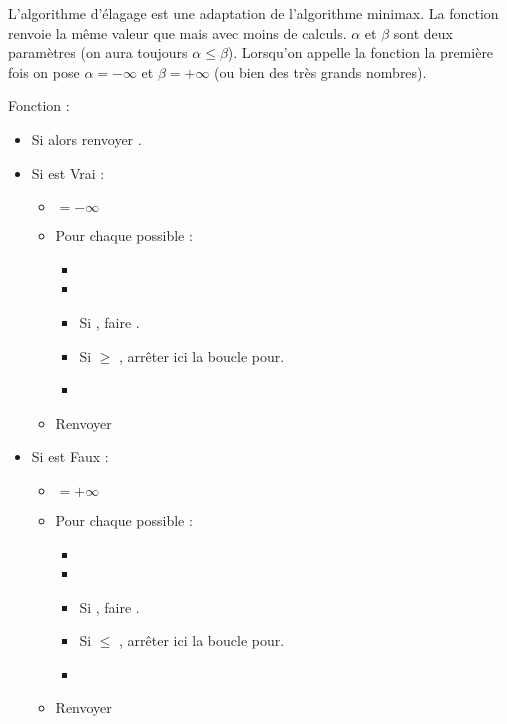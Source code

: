 \documentclass[11pt,class=report,crop=false]{standalone}
\begin{document}
L'algorithme d'élagage est une adaptation de l'algorithme minimax. La fonction  renvoie la même valeur que  mais avec moins de calculs.  
$\alpha$ et $\beta$ sont deux paramètres (on aura toujours $\alpha \le \beta$). Lorsqu'on appelle la fonction la première fois on pose $\alpha=-\infty$ et $\beta=+\infty$ (ou bien des très grands nombres).

\begin{algorithme}
	Fonction : 
	
	\begin{itemize}
		\item Si  alors renvoyer .
		
		\item Si  est Vrai :
		\begin{itemize}
			\item {} $= -\infty$		
			\item Pour chaque  possible :
			\begin{itemize}			
				\item {}
				\item {}
				\item Si , faire .
				\item Si  $\ge$ , arrêter ici la boucle \og{}pour\fg{}.
				\item {}
			\end{itemize}
			    	
			\item Renvoyer 
		\end{itemize}
		
		\item Si  est Faux :
		\begin{itemize}
       	    \item {} $= +\infty$		
			\item Pour chaque  possible :
			\begin{itemize}			
		\item {}
		\item {}
		\item Si , faire .
		\item Si  $\le$ , arrêter ici la boucle \og{}pour\fg{}.
		\item {}
	\end{itemize}
			
			\item Renvoyer 
		\end{itemize}		
		
	\end{itemize}  
\end{algorithme}
\end{document}
